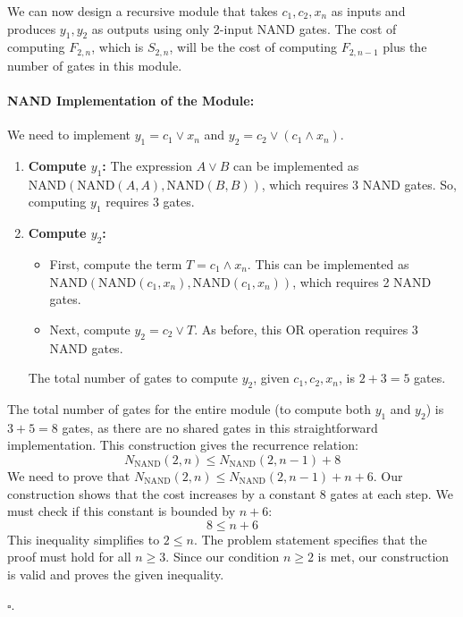 \documentclass{solutionclass} %
\begin{document}
We can now design a recursive module that takes $c_1, c_2, x_n$ as inputs and produces $y_1, y_2$ as outputs using only 2-input NAND gates.
The cost of computing $F_{2,n}$, which is $S_{2,n}$, will be the cost of computing $F_{2,n-1}$ plus the number of gates in this module.

\paragraph{NAND Implementation of the Module:}
We need to implement $y_1 = c_1 \lor x_n$ and $y_2 = c_2 \lor (c_1 \land x_n)$.
\begin{enumerate}
    \item \textbf{Compute $y_1$:} The expression $A \lor B$ can be implemented as $\text{NAND}(\text{NAND}(A,A), \text{NAND}(B,B))$, which requires 3 NAND gates. So, computing $y_1$ requires 3 gates.
    \item \textbf{Compute $y_2$:}
    \begin{itemize}
        \item First, compute the term $T = c_1 \land x_n$. This can be implemented as\\ 
        $\text{NAND}(\text{NAND}(c_1, x_n), \text{NAND}(c_1, x_n))$, which requires 2 NAND gates.
        \item Next, compute $y_2 = c_2 \lor T$. As before, this OR operation requires 3 NAND gates.
    \end{itemize}
    The total number of gates to compute $y_2$, given $c_1, c_2, x_n$, is $2+3=5$ gates.
\end{enumerate}
The total number of gates for the entire module (to compute both $y_1$ and $y_2$) is $3 + 5 = 8$ gates, as there are no shared gates in this straightforward implementation.
This construction gives the recurrence relation:
\begin{equation}
    N_{\text{NAND}}(2, n) \leq N_{\text{NAND}}(2, n - 1) + 8
\end{equation}
We need to prove that $N_{\text{NAND}}(2, n) \leq N_{\text{NAND}}(2, n - 1) + n + 6$. Our construction shows that the cost increases by a constant 8 gates at each step. We must check if this constant is bounded by $n+6$:
\begin{equation}
    8 \leq n + 6
\end{equation}
This inequality simplifies to $2 \leq n$. The problem statement specifies that the proof must hold for all $n \geq 3$. Since our condition $n \geq 2$ is met, our construction is valid and proves the given inequality.
\begin{flushright}
$\square$.
\end{flushright}
\end{document}
